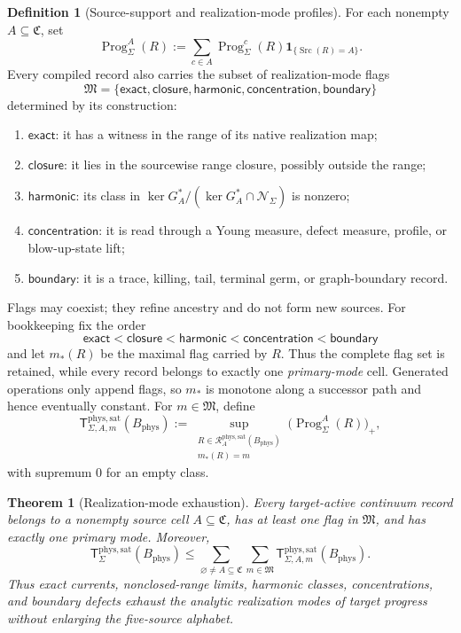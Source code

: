 \documentclass[11pt]{article}
\numberwithin{section}{part}
\theoremstyle{plain}
\newtheorem{theorem}{Theorem}[section]
\theoremstyle{definition}
\newtheorem{definition}[definition]{Definition}
\theoremstyle{remark}
\newcommand{\Channels}{\mathfrak C}
\newcommand{\Modes}{\mathfrak M}
\newcommand{\Src}{\operatorname{Src}}
\newcommand{\Null}{\mathscr N}
\newcommand{\Records}{\mathscr R}
\newcommand{\Phys}{\mathrm{phys}}
\newcommand{\Sat}{\mathrm{sat}}
\newcommand{\Budget}{B_{\Phys}}
\begin{document}
\begin{definition}[Source-support and realization-mode profiles]
\label{def:source-support-realization-profiles}
For each nonempty \(A\subseteq\Channels\), set
\[
 \operatorname{Prog}_\Sigma^A(R)
 :=\sum_{c\in A}\operatorname{Prog}_\Sigma^c(R)
   \mathbf 1_{\{\Src(R)=A\}}.
\]
Every compiled record also carries the subset of realization-mode flags
\[
 \Modes=\{\mathsf{exact},\mathsf{closure},\mathsf{harmonic},
          \mathsf{concentration},\mathsf{boundary}\}
\]
determined by its construction:
\begin{enumerate}[label=\textup{(M\arabic*)}]
\item \(\mathsf{exact}\): it has a witness in the range of its native
realization map;
\item \(\mathsf{closure}\): it lies in the sourcewise range closure, possibly
outside the range;
\item \(\mathsf{harmonic}\): its class in
\(\ker G_A^*/(\ker G_A^*\cap\Null_\Sigma)\) is nonzero;
\item \(\mathsf{concentration}\): it is read through a Young measure, defect
measure, profile, or blow-up-state lift;
\item \(\mathsf{boundary}\): it is a trace, killing, tail, terminal germ, or
graph-boundary record.
\end{enumerate}
Flags may coexist; they refine ancestry and do not form new sources.  For
bookkeeping fix the order
\[
 \mathsf{exact}<\mathsf{closure}<\mathsf{harmonic}
 <\mathsf{concentration}<\mathsf{boundary}
\]
and let \(m_*(R)\) be the maximal flag carried by \(R\).  Thus the complete
flag set is retained, while every record belongs to exactly one
\emph{primary-mode} cell.  Generated operations only append flags, so
\(m_*\) is monotone along a successor path and hence eventually constant.
For \(m\in\Modes\), define
\begin{equation}
 \label{eq:source-mode-profile}
 \mathsf T_{\Sigma,A,m}^{\Phys,\Sat}(\Budget)
 :=\sup_{\substack{R\in\Records_A^{\Phys,\Sat}(\Budget)\\m_*(R)=m}}
       \bigl(\operatorname{Prog}_\Sigma^A(R)\bigr)_+,
\end{equation}
with supremum \(0\) for an empty class.
\end{definition}

\begin{theorem}[Realization-mode exhaustion]
\label{thm:realization-mode-exhaustion}
Every target-active continuum record belongs to a nonempty source cell
\(A\subseteq\Channels\), has at least one flag in \(\Modes\), and has exactly
one primary mode.  Moreover,
\begin{equation}
 \label{eq:mode-profile-exhaustion}
 \mathsf T_\Sigma^{\Phys,\Sat}(\Budget)
 \le
 \sum_{\varnothing\ne A\subseteq\Channels}
 \sum_{m\in\Modes}
 \mathsf T_{\Sigma,A,m}^{\Phys,\Sat}(\Budget).
\end{equation}
Thus exact currents, nonclosed-range limits, harmonic classes,
concentrations, and boundary defects exhaust the analytic realization modes
of target progress without enlarging the five-source alphabet.
\end{theorem}
\end{document}
